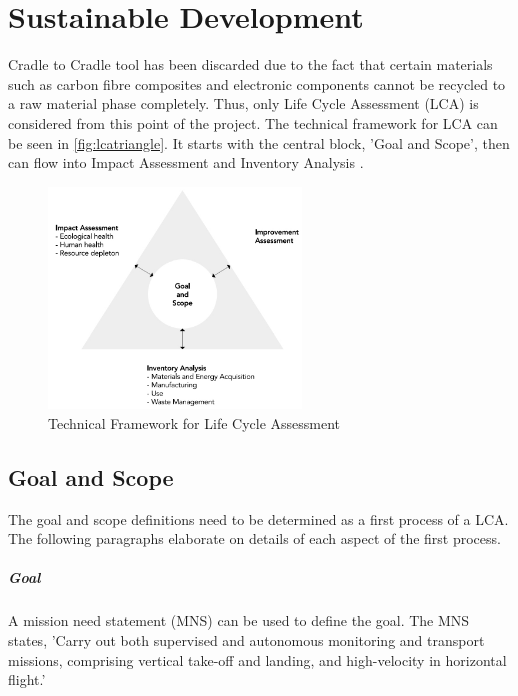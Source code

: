 \chapter{Sustainable Development}
\label{ch:sustaindev}
\setlength{\parindent}{15pt}

Cradle to Cradle tool has been discarded due to the fact that certain materials such as carbon fibre composites and electronic components cannot be recycled to a raw material phase completely. Thus, only Life Cycle Assessment (LCA) is considered from this point of the project. The technical framework for LCA can be seen in \autoref{fig:lcatriangle}. It starts with the central block, 'Goal and Scope', then can flow into Impact Assessment and Inventory Analysis \cite{lca}.

\begin{figure}[H]
    \centering
    \includegraphics[width=0.6\textwidth]{SustainableDev/Figures/LCAtriangle.pdf}
    \caption{Technical Framework for Life Cycle Assessment}
    \label{fig:lcatriangle}
\end{figure}


\section{Goal and Scope}
The goal and scope definitions need to be determined as a first process of a LCA. The following paragraphs elaborate on details of each aspect of the first process. 

\paragraph{Goal} A mission need statement (MNS) can be used to define the goal. The MNS states, 'Carry out both supervised and autonomous monitoring and transport missions, comprising vertical take-off and landing, and high-velocity in horizontal flight.'

